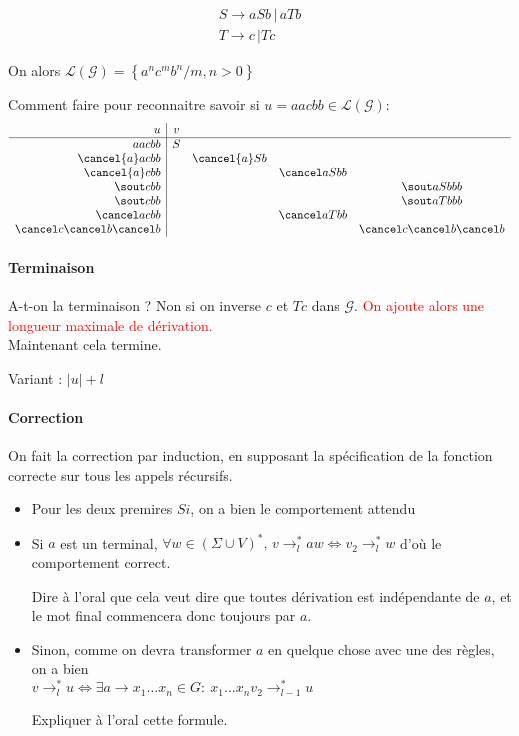 $$ \begin{array}{c}S \to aSb \, | \, aTb \\
T \to c \, | Tc
\end{array}
$$

On alors $\mathcal{L(G)} = \left\{a^nc^mb^n \big/ m,n > 0\right\}$

Comment faire pour reconnaitre savoir si $u = aacbb \in \mathcal{L(G)}$:
$$ 
\begin{array}{r|cccc}
u & v \\ \hline
aacbb & S &&& \\
\cancel{a}acbb & & \cancel{a}Sb && \\
\cancel{a}cbb&&&\cancel aSbb& \\
\sout c bb&&&& \sout a Sbbb\\
\sout cbb&&& & \sout aTbbb\\
\cancel acbb & & & \cancel a Tbb  & \\
\cancel c\cancel b\cancel b&&&& \cancel c\cancel b \cancel b\\
\end{array}
$$


\paragraph{Terminaison} A-t-on la terminaison ? Non si on inverse $c$ et $Tc$ dans $\mathcal G$. \textcolor{red}{On ajoute alors une longueur maximale de dérivation.}\\

Maintenant cela termine.

Variant : $|u| + l$


\paragraph{Correction} On fait la correction par induction, en supposant la spécification de la fonction correcte sur tous les appels récursifs.
\begin{itemize}[label=$\star$]
	\item Pour les deux premires $Si$, on a bien le comportement attendu
	\item Si $a$ est un terminal, $\forall w \in (\Sigma \cup V)^*, \, v \rightarrow^*_l aw \Leftrightarrow v_2 \rightarrow^*_l w $ d'où le comportement correct.
	\begin{com}
		Dire à l'oral que cela veut dire que toutes dérivation est indépendante de $a$, et le mot final commencera donc toujours par $a$.
	\end{com}
	\item Sinon, comme on devra transformer $a$ en quelque chose avec une des règles, on a bien \\
	$v\rightarrow^*_l u \Leftrightarrow \exists  a \to x_1\dots x_n \in G :\: x_1\dots x_n v_2 \rightarrow^*_{l-1} u$
	\begin{com}
		Expliquer à l'oral cette formule.
	\end{com}
\end{itemize}

